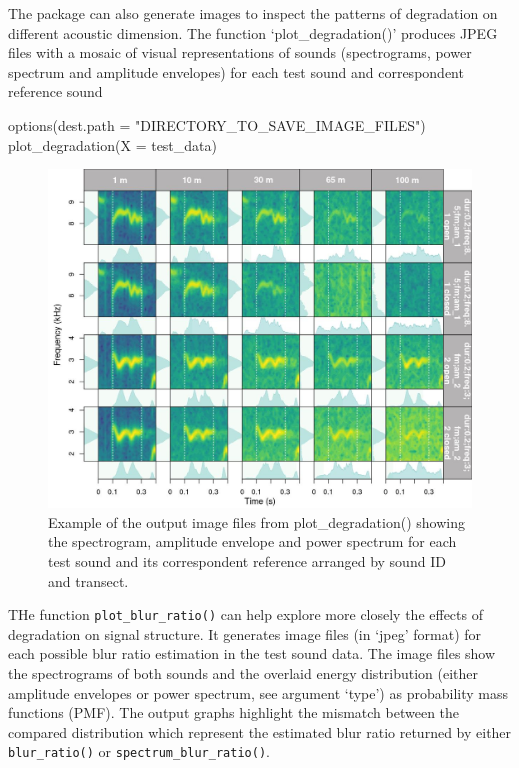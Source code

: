 \documentclass[
  letterpaper,
  DIV=11,
  numbers=noendperiod]{scrartcl}
\newenvironment{Shaded}{\begin{snugshade}}{\end{snugshade}}
\newcommand{\AttributeTok}[1]{\textcolor[rgb]{0.49,0.56,0.16}{#1}}
\newcommand{\FunctionTok}[1]{\textcolor[rgb]{0.02,0.16,0.49}{#1}}
\newcommand{\NormalTok}[1]{\textcolor[rgb]{0.00,0.44,0.13}{#1}}
\newcommand{\StringTok}[1]{\textcolor[rgb]{0.25,0.44,0.63}{#1}}
\begin{document}
The package can also generate images to inspect the patterns of
degradation on different acoustic dimension. The function
`plot\_degradation()' produces JPEG files with a mosaic of visual
representations of sounds (spectrograms, power spectrum and amplitude
envelopes) for each test sound and correspondent reference sound

\begin{Shaded}
\begin{Highlighting}[numbers=left,,]
\FunctionTok{options}\NormalTok{(}\AttributeTok{dest.path =} \StringTok{"DIRECTORY\_TO\_SAVE\_IMAGE\_FILES"}\NormalTok{)}
\FunctionTok{plot\_degradation}\NormalTok{(}\AttributeTok{X =}\NormalTok{ test\_data)}
\end{Highlighting}
\end{Shaded}

\begin{figure}

{\centering \includegraphics{plot_degradation_p1.jpeg}

}

\caption{Example of the output image files from plot\_degradation()
showing the spectrogram, amplitude envelope and power spectrum for each
test sound and its correspondent reference arranged by sound ID and
transect.}

\end{figure}

THe function \texttt{plot\_blur\_ratio()} can help explore more closely
the effects of degradation on signal structure. It generates image files
(in `jpeg' format) for each possible blur ratio estimation in the test
sound data. The image files show the spectrograms of both sounds and the
overlaid energy distribution (either amplitude envelopes or power
spectrum, see argument `type') as probability mass functions (PMF). The
output graphs highlight the mismatch between the compared distribution
which represent the estimated blur ratio returned by either
\texttt{blur\_ratio()} or \texttt{spectrum\_blur\_ratio()}.
\end{document}
